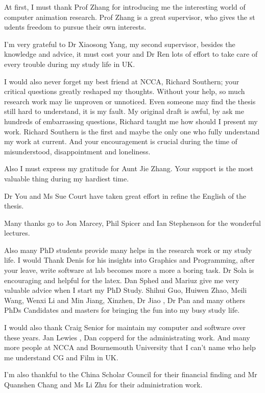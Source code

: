 

\begin{acknowledgements}      %

At first, I must thank Prof Zhang for introducing me the interesting world of computer animation research.
Prof Zhang is a great supervisor, who gives the st\label{•} udents freedom to pursue their own interests. 
 
I'm very grateful to Dr Xiaosong Yang, my second supervisor, besides the knowledge and advice, it must cost your and Dr Ren lots of effort to take care of every trouble during my study life in UK.
 
 I would also never forget my best friend at NCCA, Richard Southern; your critical questions greatly reshaped my thoughts.
 Without your help, so much research work may lie unproven or unnoticed.
 Even someone may find the thesis still hard to understand, it is my fault.
 My original draft is awful, by ask me hundreds of embarrassing questions, Richard taught me how should I present my work.
Richard Southern is the first and maybe the only one who fully understand my work at current.
 And your encouragement is crucial during the time of misunderstood, disappointment and loneliness.

 Also I must express my gratitude for Aunt Jie Zhang. Your support is the most valuable thing during my hardiest time.
 
 Dr You and Ms Sue Court have taken great effort in refine the English of the thesis.
 
Many thanks go to Jon Marcey, Phil Spicer and Ian Stephenson for the wonderful lectures.

Also many PhD students provide many helps in the research work or my study life.
I would Thank Denis for his insights into Graphics and Programming, after your leave, write software at lab becomes more a more a boring task. Dr Sola is encouraging and helpful for the latex.
Dan Sphed and Mariuz give me very valuable advice when I start my PhD Study.
Shihui Guo, Huiwen Zhao, Meili Wang, Wenxi Li and Min Jiang, Xinzhen, Dr Jiao , Dr Pan and many others PhDs Candidates and masters for  bringing the fun into my busy study life.


I would also thank Craig Senior for maintain my computer and software over these years.
Jan Lewies , Dan copperd for the administrating work.
And many more people at NCCA and Bournemouth University that I can’t name who help me understand CG and Film in UK.

I’m also thankful to the China Scholar Council for their financial finding and Mr Quanshen Chang and Ms Li Zhu for their administration work.
 
 
 
 
 
 
 


\end{acknowledgements}


